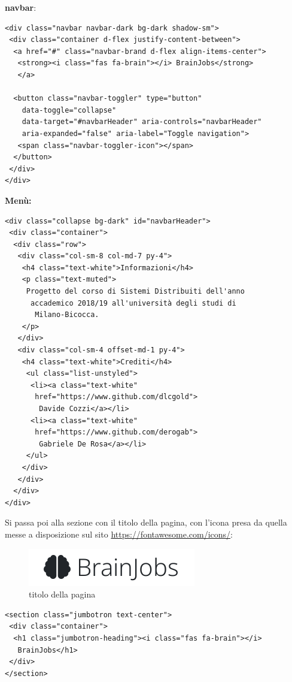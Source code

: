 \documentclass[a4paper,12pt, oneside]{book}
\begin{document}
\textbf{navbar}:
\begin{shaded}
\begin{verbatim}
<div class="navbar navbar-dark bg-dark shadow-sm">
 <div class="container d-flex justify-content-between">
  <a href="#" class="navbar-brand d-flex align-items-center">
   <strong><i class="fas fa-brain"></i> BrainJobs</strong>
   </a>
   
  <button class="navbar-toggler" type="button"
    data-toggle="collapse"
    data-target="#navbarHeader" aria-controls="navbarHeader"
    aria-expanded="false" aria-label="Toggle navigation">
   <span class="navbar-toggler-icon"></span>
  </button>
 </div>
</div>
\end{verbatim}
\end{shaded}
\textbf{Menù:}
\begin{shaded}
\begin{verbatim}
<div class="collapse bg-dark" id="navbarHeader">
 <div class="container">
  <div class="row">
   <div class="col-sm-8 col-md-7 py-4">
    <h4 class="text-white">Informazioni</h4>
    <p class="text-muted">
     Progetto del corso di Sistemi Distribuiti dell'anno
      accademico 2018/19 all'università degli studi di
       Milano-Bicocca.
    </p>
   </div>
   <div class="col-sm-4 offset-md-1 py-4">
    <h4 class="text-white">Crediti</h4>
     <ul class="list-unstyled">
      <li><a class="text-white"
       href="https://www.github.com/dlcgold">
        Davide Cozzi</a></li>
      <li><a class="text-white"
       href="https://www.github.com/derogab">
        Gabriele De Rosa</a></li>
     </ul>
    </div>
   </div>
  </div>
</div>
\end{verbatim}
\end{shaded}
Si passa poi alla sezione con il titolo della pagina, con l'icona presa da quella
messe a disposizione sul sito \url{https://fontawesome.com/icons/}:
\begin{figure}[h!]
  \centering
  \includegraphics[scale = 0.8]{img/titolo.png}
  \caption{titolo della pagina}
\end{figure}
\begin{shaded}
\begin{verbatim}
<section class="jumbotron text-center">
 <div class="container">
  <h1 class="jumbotron-heading"><i class="fas fa-brain"></i>
   BrainJobs</h1>
 </div>
</section>
\end{verbatim}
\end{shaded}
\end{document}
